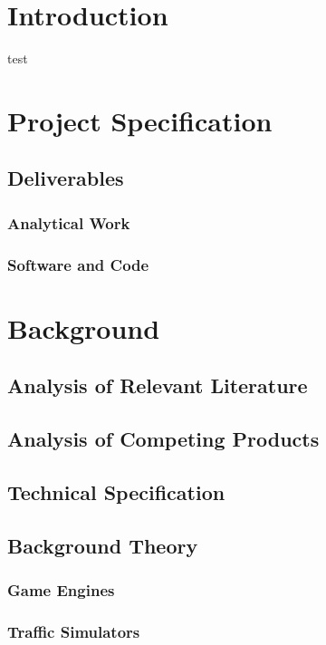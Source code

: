 \documentclass[12pt,twoside]{article}
\begin{document}


\tableofcontents
\newpage

\section{Introduction}
test
\cite{10.1145/1497577.1497578}

\section{Project Specification}

\subsection{Deliverables}
\subsubsection{Analytical Work}
\subsubsection{Software and Code}



\section{Background}
\subsection{Analysis of Relevant Literature}
\subsection{Analysis of Competing Products}

\subsection{Technical Specification}

\subsection{Background Theory}
\subsubsection{Game Engines}
\subsubsection{Traffic Simulators}
\end{document}
